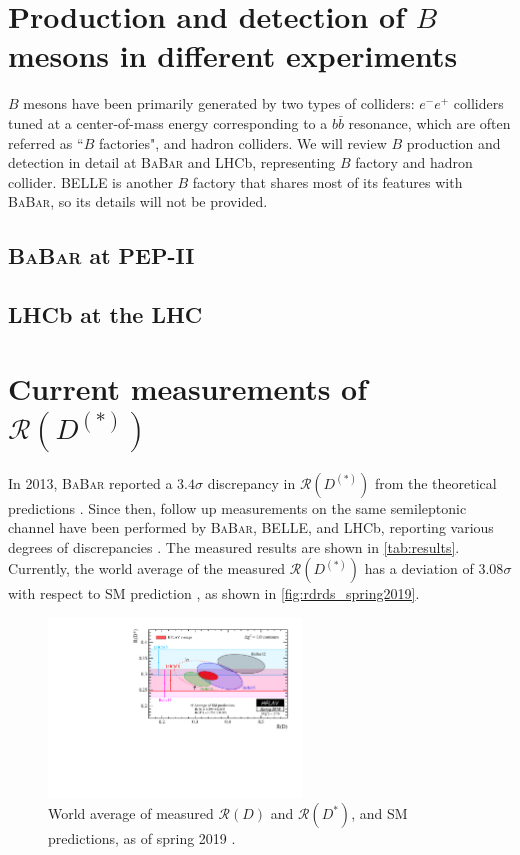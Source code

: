 \documentclass[12pt,letterpaper]{article}
\def\BaBar/{\textsc{BaBar}}
\def\RD/{\ensuremath{\mathcal{R}(D)}}
\def\RDst/{\ensuremath{\mathcal{R}(D^{*})}}
\def\RDDst/{\ensuremath{\mathcal{R}(D^{(*)})}}
\begin{document}
\section{Production and detection of $B$ mesons in different experiments}
$B$ mesons have been primarily generated by two types of colliders:
$e^- e^+$ colliders tuned at a center-of-mass energy corresponding to a
$b\bar{b}$ resonance, which are often referred as ``$B$ factories", and hadron
colliders.
We will review $B$ production and detection in detail at \BaBar/ and LHCb,
representing $B$ factory and hadron collider.
BELLE is another $B$ factory that shares most of its features with \BaBar/, so
its details will not be provided.

\subsection{\BaBar/ at PEP-II} \label{sec:babar}


\subsection{LHCb at the LHC} \label{sec:lhcb}


\section{Current measurements of \RDDst/}
In 2013, \BaBar/ reported a $3.4\sigma$ discrepancy in \RDDst/ from the
theoretical predictions \cite{Lees:2013rw}.
Since then, follow up measurements on the same semileptonic channel have been
performed by \BaBar/, BELLE, and LHCb, reporting various degrees of
discrepancies \cite{Hirose:2017185, LHCb:PhysRevLett.115.111803, Aaij:2017deq}.
The measured results are shown in \autoref{tab:results}.
Currently, the world average of the measured \RDDst/ has a deviation of
$3.08\sigma$ with respect to SM prediction \cite{HFLAV:2019}, as shown
in \autoref{fig:rdrds_spring2019}.

\begin{figure}[ht]
    \centering
    \includegraphics[width=0.6\textwidth]{figs/rdrds_spring2019.pdf}
    \caption{
        World average of measured \RD/ and \RDst/, and SM predictions, as of
        spring 2019 \cite{HFLAV:2019}.
    }
    \label{fig:rdrds_spring2019}
\end{figure}
\end{document}
